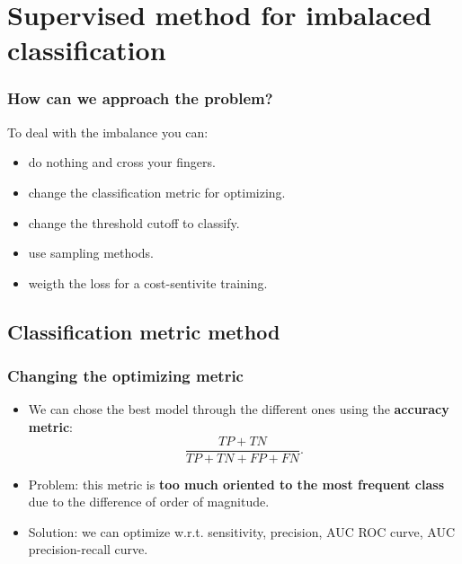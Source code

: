 \documentclass[9pt]{beamer}
\begin{document}
\section{Supervised method for imbalaced classification}
\begin{frame}
\frametitle{How can we approach the problem?}
To deal with the imbalance you can:
\begin{itemize}
\item<1 -> do nothing and cross your fingers.
\item<2 -> change the classification metric for optimizing.
\item<3 -> change the threshold cutoff to classify.
\item<4 -> use sampling methods.
\item<5 -> weigth the loss for a cost-sentivite training.
\end{itemize}
\end{frame}
\subsection{Classification metric method}
\begin{frame}
\frametitle{Changing the optimizing metric}
\begin{itemize}
\item<1 -> We can chose the best model through the different ones using the \textbf{accuracy metric}:
$$\dfrac{TP + TN}{TP + TN + FP + FN}.$$
\item<2 -> Problem: this metric is \textbf{too much oriented to the most frequent class} due to the difference of order of magnitude.
\item<3 -> Solution: we can optimize w.r.t. sensitivity, precision, AUC ROC curve, AUC precision-recall curve.
\end{itemize}
\end{frame}
\end{document}
